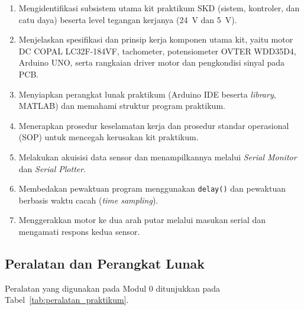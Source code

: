 \documentclass[11pt,a4paper]{article}
\begin{document}
\begin{enumerate}
	\item Mengidentifikasi subsistem utama kit praktikum SKD (sistem, kontroler, dan catu daya) beserta level tegangan kerjanya (24~V dan 5~V).
	\item Menjelaskan spesifikasi dan prinsip kerja komponen utama kit, yaitu motor DC COPAL LC32F-184VF, tachometer, potensiometer OVTER WDD35D4, Arduino UNO, serta rangkaian driver motor dan pengkondisi sinyal pada PCB.
	\item Menyiapkan perangkat lunak praktikum (Arduino IDE beserta \textit{library}, MATLAB) dan memahami struktur program praktikum.
	\item Menerapkan prosedur keselamatan kerja dan prosedur standar operasional (SOP) untuk mencegah kerusakan kit praktikum.
	\item Melakukan akuisisi data sensor dan menampilkannya melalui \textit{Serial Monitor} dan \textit{Serial Plotter}.
	\item Membedakan pewaktuan program menggunakan \texttt{delay()} dan pewaktuan berbasis waktu cacah (\textit{time sampling}).
	\item Menggerakkan motor ke dua arah putar melalui masukan serial dan mengamati respons kedua sensor.
\end{enumerate}

\subsection{Peralatan dan Perangkat Lunak}
Peralatan yang digunakan pada Modul 0 ditunjukkan pada Tabel~\ref{tab:peralatan_praktikum}.
\end{document}
